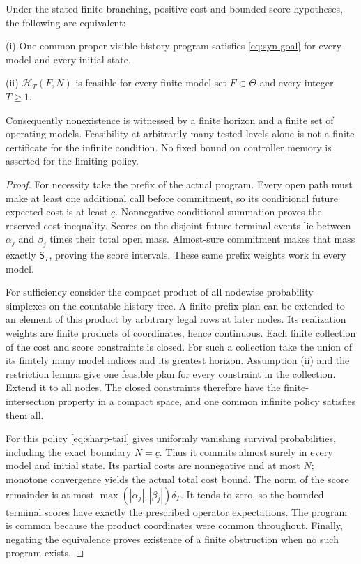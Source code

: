 \begin{theorem}\label{thm:causal-hierarchy}
Under the stated finite-branching, positive-cost and bounded-score hypotheses, the following are equivalent:

\textup{(i)} One common proper visible-history program satisfies \eqref{eq:syn-goal} for every model and every initial state.

\textup{(ii)} $\mathcal H_T(F,N)$ is feasible for every finite model set $F\subset\Theta$ and every integer $T\ge1$.

Consequently nonexistence is witnessed by a finite horizon and a finite set of operating models. Feasibility at arbitrarily many tested levels alone is not a finite certificate for the infinite condition. No fixed bound on controller memory is asserted for the limiting policy.
\end{theorem}
\begin{proof}
For necessity take the prefix of the actual program. Every open path must make at least one additional call before commitment, so its conditional future expected cost is at least $\underline c$. Nonnegative conditional summation proves the reserved cost inequality. Scores on the disjoint future terminal events lie between $\alpha_j$ and $\beta_j$ times their total open mass. Almost-sure commitment makes that mass exactly $\mathsf S_T$, proving the score intervals. These same prefix weights work in every model.

For sufficiency consider the compact product of all nodewise probability simplexes on the countable history tree. A finite-prefix plan can be extended to an element of this product by arbitrary legal rows at later nodes. Its realization weights are finite products of coordinates, hence continuous. Each finite collection of the cost and score constraints is closed. For such a collection take the union of its finitely many model indices and its greatest horizon. Assumption (ii) and the restriction lemma give one feasible plan for every constraint in the collection. Extend it to all nodes. The closed constraints therefore have the finite-intersection property in a compact space, and one common infinite policy satisfies them all.

For this policy \eqref{eq:sharp-tail} gives uniformly vanishing survival probabilities, including the exact boundary $N=\underline c$. Thus it commits almost surely in every model and initial state. Its partial costs are nonnegative and at most $N$; monotone convergence yields the actual total cost bound. The norm of the score remainder is at most $\max(|\alpha_j|,|\beta_j|)\delta_T$. It tends to zero, so the bounded terminal scores have exactly the prescribed operator expectations. The program is common because the product coordinates were common throughout. Finally, negating the equivalence proves existence of a finite obstruction when no such program exists.
\end{proof}

